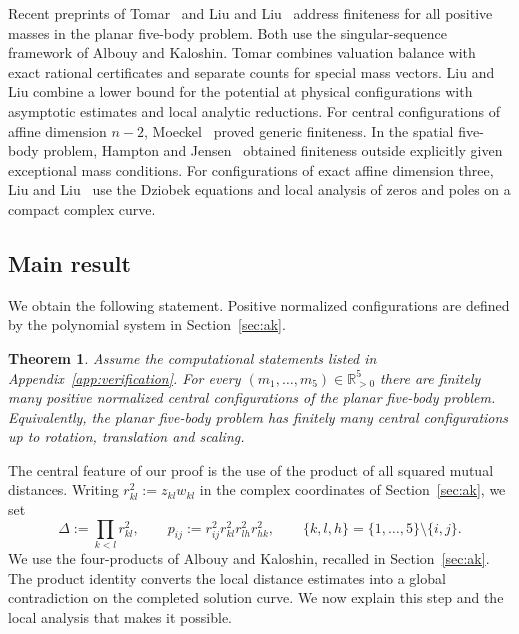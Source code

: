 \documentclass[Threeside,11pt]{article}
\newtheorem{theorem}{Theorem}[section]
\theoremstyle{definition}
\theoremstyle{remark}
\numberwithin{equation}{section}
\theoremstyle{remark}
\newcommand{\Rp}{\mathbb{R}_{>0}}
\begin{document}
Recent preprints of Tomar~\cite{FiveT} and Liu and Liu~\cite{LL26planar}
address finiteness for all positive masses in the planar five-body problem.
Both use the singular-sequence framework of Albouy and Kaloshin. Tomar combines
valuation balance with exact rational certificates and separate counts for
special mass vectors. Liu and Liu combine a lower bound for the potential at
physical configurations with asymptotic estimates and local analytic
reductions. For central configurations of affine dimension $n-2$,
Moeckel~\cite{Moe01} proved generic finiteness. In the spatial five-body
problem, Hampton and Jensen~\cite{HJ} obtained finiteness outside explicitly
given exceptional mass conditions. For configurations of exact affine dimension
three, Liu and Liu~\cite{LL26dziobek} use the Dziobek equations and local analysis of zeros and
poles on a compact complex curve.

\subsection*{Main result}
We obtain the following statement. Positive normalized configurations are
defined by the polynomial system in Section~\ref{sec:ak}.

\begin{theorem}\label{thm:main}
Assume the computational statements listed in Appendix~\ref{app:verification}.
For every $(m_1,\dots,m_5)\in\Rp^5$ there are finitely many positive normalized
central configurations of the planar five-body problem. Equivalently, the
planar five-body problem has finitely many central configurations up to
rotation, translation and scaling.
\end{theorem}

The central feature of our proof is the use of the product of all squared
mutual distances. Writing $r_{kl}^2:=z_{kl}w_{kl}$ in the complex coordinates of
Section~\ref{sec:ak}, we set
\[
 \Delta:=\prod_{k<l}r_{kl}^2,\qquad
 p_{ij}:=r_{ij}^2r_{kl}^2r_{lh}^2r_{hk}^2,
 \qquad \{k,l,h\}=\{1,\dots,5\}\setminus\{i,j\}.
\]
We use the four-products of Albouy and Kaloshin, recalled in Section~\ref{sec:ak}.
The product identity converts the local distance estimates into a global
contradiction on the completed solution curve. We now explain this step and
the local analysis that makes it possible.
\end{document}
